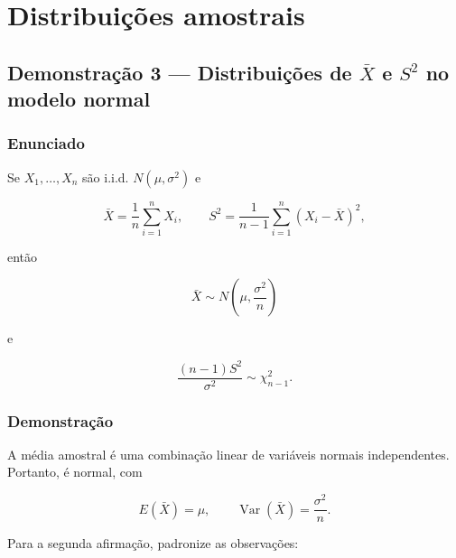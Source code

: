\documentclass[
  letterpaper,
  DIV=11,
  numbers=noendperiod]{scrreprt}
\begin{document}

\chapter*{Distribuições
amostrais}\label{distribuiuxe7uxf5es-amostrais-1}


\section*{\texorpdfstring{Demonstração 3 --- Distribuições de \(\bar X\)
e \(S^2\) no modelo
normal}{Demonstração 3 --- Distribuições de \textbackslash bar X e S\^{}2 no modelo normal}}\label{demonstrauxe7uxe3o-3-distribuiuxe7uxf5es-de-bar-x-e-s2-no-modelo-normal}


\subsection*{Enunciado}\label{enunciado-2}

Se \(X_1,\ldots,X_n\) são i.i.d. \(N(\mu,\sigma^2)\) e

\[
\bar X=\frac{1}{n}\sum_{i=1}^nX_i,
\qquad
S^2=\frac{1}{n-1}\sum_{i=1}^n(X_i-\bar X)^2,
\]

então

\[
\bar X\sim N\left(\mu,\frac{\sigma^2}{n}\right)
\]

e

\[
\frac{(n-1)S^2}{\sigma^2}\sim\chi^2_{n-1}.
\]

\subsection*{Demonstração}\label{demonstrauxe7uxe3o-3}

A média amostral é uma combinação linear de variáveis normais
independentes. Portanto, é normal, com

\[
E(\bar X)=\mu,
\qquad
\operatorname{Var}(\bar X)=\frac{\sigma^2}{n}.
\]

Para a segunda afirmação, padronize as observações:
\end{document}
